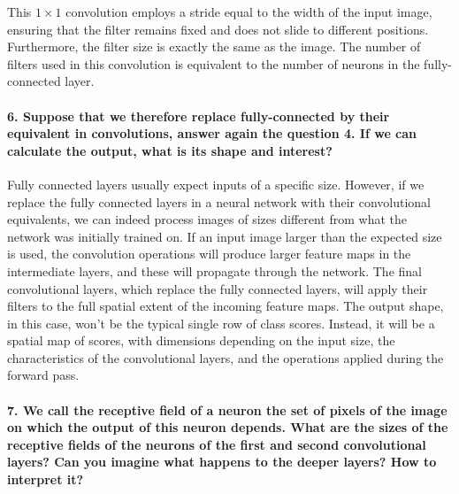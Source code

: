 This $1 \times 1$ convolution employs a stride equal to the width of the input image, ensuring that the filter remains fixed and does not slide to different positions. Furthermore, the filter size is exactly the same as the image. The number of filters used in this convolution is equivalent to the number of neurons in the fully-connected layer.

\paragraph{6. Suppose that we therefore replace fully-connected by their equivalent in convolutions, answer again the question 4. If we can calculate the output, what is its shape and interest?}
Fully connected layers usually expect inputs of a specific size. However, if we replace the fully connected layers in a neural network with their convolutional equivalents, we can indeed process images of sizes different from what the network was initially trained on. If an input image larger than the expected size is used, the convolution operations will produce larger feature maps in the intermediate layers, and these will propagate through the network. The final convolutional layers, which replace the fully connected layers, will apply their filters to the full spatial extent of the incoming feature maps. The output shape, in this case, won't be the typical single row of class scores. Instead, it will be a spatial map of scores, with dimensions depending on the input size, the characteristics of the convolutional layers, and the operations applied during the forward pass.


\paragraph{7. We call the receptive field of a neuron the set of pixels of the image on which the output of this neuron depends. What are the sizes of the receptive fields of the neurons of the first and second convolutional layers? Can you imagine what happens to the deeper layers? How to interpret it?}

